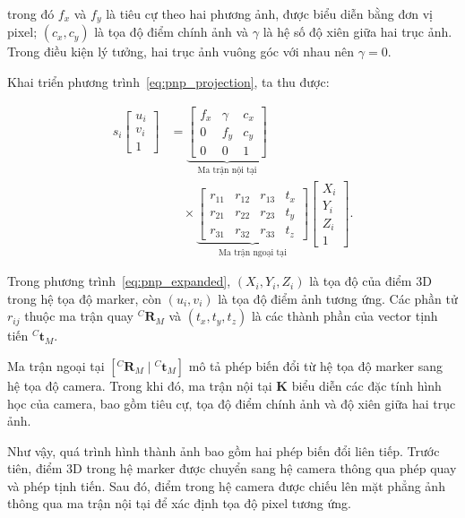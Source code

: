 trong đó $f_x$ và $f_y$ là tiêu cự theo hai phương ảnh,
được biểu diễn bằng đơn vị pixel; $(c_x,c_y)$ là tọa độ
điểm chính ảnh và $\gamma$ là hệ số độ xiên giữa hai
trục ảnh. Trong điều kiện lý tưởng, hai trục ảnh vuông
góc với nhau nên $\gamma=0$.

Khai triển phương trình~\eqref{eq:pnp_projection},
ta thu được:

\begin{equation}
\begin{aligned}
s_i
\begin{bmatrix}
u_i\\
v_i\\
1
\end{bmatrix}
&=
\underbrace{
\begin{bmatrix}
f_x & \gamma & c_x\\
0 & f_y & c_y\\
0 & 0 & 1
\end{bmatrix}
}_{\text{Ma trận nội tại}}
\\[6pt]
&\quad \times
\underbrace{
\begin{bmatrix}
r_{11} & r_{12} & r_{13} & t_x\\
r_{21} & r_{22} & r_{23} & t_y\\
r_{31} & r_{32} & r_{33} & t_z
\end{bmatrix}
}_{\text{Ma trận ngoại tại}}
\begin{bmatrix}
X_i\\
Y_i\\
Z_i\\
1
\end{bmatrix}.
\end{aligned}
\label{eq:pnp_expanded}
\end{equation}

Trong phương trình~\eqref{eq:pnp_expanded},
$(X_i,Y_i,Z_i)$ là tọa độ của điểm 3D trong hệ tọa độ
marker, còn $(u_i,v_i)$ là tọa độ điểm ảnh tương ứng.
Các phần tử $r_{ij}$ thuộc ma trận quay
${}^{C}\mathbf{R}_{M}$ và $(t_x,t_y,t_z)$ là các
thành phần của vector tịnh tiến
${}^{C}\mathbf{t}_{M}$.

Ma trận ngoại tại
$[{}^{C}\mathbf{R}_{M}\mid{}^{C}\mathbf{t}_{M}]$
mô tả phép biến đổi từ hệ tọa độ marker sang hệ tọa độ
camera. Trong khi đó, ma trận nội tại $\mathbf{K}$
biểu diễn các đặc tính hình học của camera, bao gồm
tiêu cự, tọa độ điểm chính ảnh và độ xiên giữa
hai trục ảnh.

Như vậy, quá trình hình thành ảnh bao gồm hai phép
biến đổi liên tiếp. Trước tiên, điểm 3D trong hệ marker
được chuyển sang hệ camera thông qua phép quay và phép
tịnh tiến. Sau đó, điểm trong hệ camera được chiếu
lên mặt phẳng ảnh thông qua ma trận nội tại để xác
định tọa độ pixel tương ứng.

